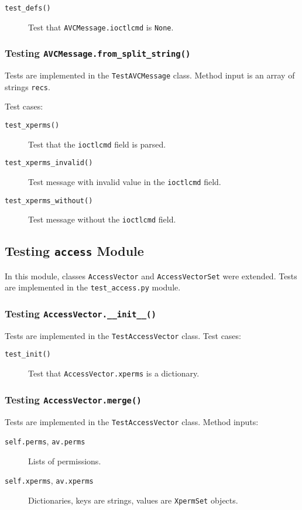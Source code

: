 \begin{description}
    \item [\texttt{test\_defs()}] Test that \texttt{AVCMessage.ioctlcmd} is
        \texttt{None}.
\end{description}

\subsubsection{Testing \texttt{AVCMessage.from\_split\_string()}}
Tests are implemented in the \texttt{TestAVCMessage} class. Method input is an
array of strings \texttt{recs}.

Test cases:
\begin{description}
    \item [\texttt{test\_xperms()}] Test that the \texttt{ioctlcmd} field is
        parsed.
    \item [\texttt{test\_xperms\_invalid()}] Test message with invalid value in
        the \texttt{ioctlcmd} field.
    \item [\texttt{test\_xperms\_without()}] Test message without the
        \texttt{ioctlcmd} field.
\end{description}

\subsection{Testing \texttt{access} Module}
In this module, classes \texttt{AccessVector} and \texttt{AccessVectorSet} were
extended. Tests are implemented in the \texttt{test\_access.py} module.

\subsubsection{Testing \texttt{AccessVector.\_\_init\_\_()}}
Tests are implemented in the \texttt{TestAccessVector} class. Test cases:

\begin{description}
    \item [\texttt{test\_init()}] Test that
        \texttt{AccessVector.xperms} is a dictionary.
\end{description}

\subsubsection{Testing \texttt{AccessVector.merge()}}
Tests are implemented in the \texttt{TestAccessVector} class. Method inputs:
\begin{description}
    \item [\texttt{self.perms}, \texttt{av.perms}] Lists of permissions.
    \item [\texttt{self.xperms}, \texttt{av.xperms}] Dictionaries, keys are
        strings, values are \texttt{XpermSet} objects.
\end{description}

